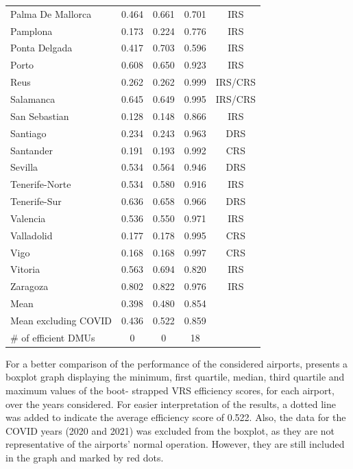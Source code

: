 \begin{table}[h!]
{\begin{tabular}{lcccc}
Palma De Mallorca & 0.464 & 0.661 & 0.701 & IRS\\
Pamplona & 0.173 & 0.224 & 0.776 & IRS\\
Ponta Delgada & 0.417 & 0.703 & 0.596 & IRS\\
Porto & 0.608 & 0.650 & 0.923 & IRS\\
Reus & 0.262 & 0.262 & 0.999 & IRS/CRS\\
Salamanca & 0.645 & 0.649 & 0.995 & IRS/CRS\\
San Sebastian & 0.128 & 0.148 & 0.866 & IRS\\
Santiago & 0.234 & 0.243 & 0.963 & DRS\\
Santander & 0.191 & 0.193 & 0.992 & CRS\\
Sevilla & 0.534 & 0.564 & 0.946 & DRS\\
Tenerife-Norte & 0.534 & 0.580 & 0.916 & IRS\\
Tenerife-Sur & 0.636 & 0.658 & 0.966 & DRS\\
Valencia & 0.536 & 0.550 & 0.971 & IRS\\
Valladolid & 0.177 & 0.178 & 0.995 & CRS\\
Vigo & 0.168 & 0.168 & 0.997 & CRS\\
Vitoria & 0.563 & 0.694 & 0.820 & IRS\\
Zaragoza & 0.802 & 0.822 & 0.976 & IRS\\
\midrule
Mean & 0.398 & 0.480 & 0.854 & \\
Mean excluding COVID & 0.436 & 0.522 & 0.859 & \\
\# of efficient DMUs & 0 & 0 & 18 & \\
\bottomrule
\end{tabular}%
}
\end{table}

\vspace{-0.2cm}



For a better comparison of the performance of the considered airports,  presents a boxplot  
graph displaying the minimum, first quartile, median, third quartile and maximum values of the boot-
strapped VRS efficiency scores, for each airport, over the years considered. For easier interpretation of
the results, a dotted line was added to indicate the average efficiency score of 0.522. Also, the data for
the COVID years (2020 and 2021) was excluded from the boxplot, as they are not representative of the
airports’ normal operation. However, they are still included in the graph and marked by red dots.

